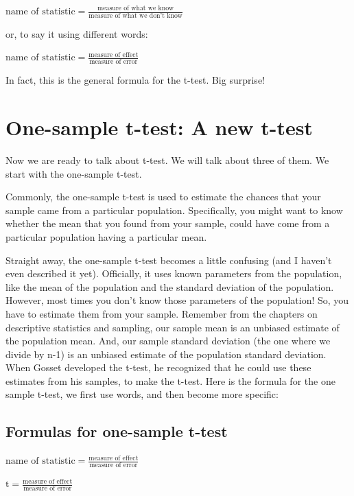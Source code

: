 \documentclass[
]{book}
\begin{document}
\(\text{name of statistic} = \frac{\text{measure of what we know}}{\text{measure of what we don't know}}\)

or, to say it using different words:

\(\text{name of statistic} = \frac{\text{measure of effect}}{\text{measure of error}}\)

In fact, this is the general formula for the t-test. Big surprise!

\hypertarget{one-sample-t-test-a-new-t-test}{%
\section{One-sample t-test: A new t-test}\label{one-sample-t-test-a-new-t-test}}

Now we are ready to talk about t-test. We will talk about three of them. We start with the one-sample t-test.

Commonly, the one-sample t-test is used to estimate the chances that your sample came from a particular population. Specifically, you might want to know whether the mean that you found from your sample, could have come from a particular population having a particular mean.

Straight away, the one-sample t-test becomes a little confusing (and I haven't even described it yet). Officially, it uses known parameters from the population, like the mean of the population and the standard deviation of the population. However, most times you don't know those parameters of the population! So, you have to estimate them from your sample. Remember from the chapters on descriptive statistics and sampling, our sample mean is an unbiased estimate of the population mean. And, our sample standard deviation (the one where we divide by n-1) is an unbiased estimate of the population standard deviation. When Gosset developed the t-test, he recognized that he could use these estimates from his samples, to make the t-test. Here is the formula for the one sample t-test, we first use words, and then become more specific:

\hypertarget{formulas-for-one-sample-t-test}{%
\subsection{Formulas for one-sample t-test}\label{formulas-for-one-sample-t-test}}

\(\text{name of statistic} = \frac{\text{measure of effect}}{\text{measure of error}}\)

\(\text{t} = \frac{\text{measure of effect}}{\text{measure of error}}\)
\end{document}
